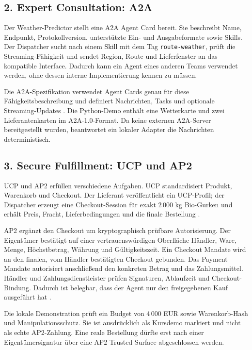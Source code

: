 \documentclass[11pt,a4paper]{article}
\begin{document}
\subsection{2. Expert Consultation: A2A}

Der Weather-Predictor stellt eine A2A Agent Card bereit. Sie beschreibt Name,
Endpunkt, Protokollversion, unterstützte Ein- und Ausgabeformate sowie Skills.
Der Dispatcher sucht nach einem Skill mit dem Tag
\texttt{route-weather}, prüft die Streaming-Fähigkeit und sendet Region,
Route und Lieferfenster an das kompatible Interface. Dadurch kann ein Agent
eines anderen Teams verwendet werden, ohne dessen interne Implementierung
kennen zu müssen.

Die A2A-Spezifikation verwendet Agent Cards genau für diese
Fähigkeitsbeschreibung und definiert Nachrichten, Tasks und optionale
Streaming-Updates \cite{a2a}. Die Python-Demo enthält eine Wetterkarte und
zwei Lieferantenkarten im A2A-1.0-Format. Da keine externen A2A-Server
bereitgestellt wurden, beantwortet ein lokaler Adapter die Nachrichten
deterministisch.

\subsection{3. Secure Fulfillment: UCP und AP2}

UCP und AP2 erfüllen verschiedene Aufgaben. UCP standardisiert Produkt,
Warenkorb und Checkout. Der Lieferant veröffentlicht ein UCP-Profil; der
Dispatcher erzeugt eine Checkout-Session für exakt 2\,000 kg Bio-Gurken und
erhält Preis, Fracht, Lieferbedingungen und die finale Bestellung
\cite{ucp}.

AP2 ergänzt den Checkout um kryptographisch prüfbare Autorisierung. Der
Eigentümer bestätigt auf einer vertrauenswürdigen Oberfläche Händler, Ware,
Menge, Höchstbetrag, Währung und Gültigkeitszeit. Ein Checkout Mandate wird an
den finalen, vom Händler bestätigten Checkout gebunden. Das Payment Mandate
autorisiert anschließend den konkreten Betrag und das Zahlungsmittel.
Händler und Zahlungsdienstleister prüfen Signaturen, Ablaufzeit und
Checkout-Bindung. Dadurch ist belegbar, dass der Agent nur den freigegebenen
Kauf ausgeführt hat \cite{ap2}.

Die lokale Demonstration prüft ein Budget von 4\,000 EUR sowie Warenkorb-Hash
und Manipulationsschutz. Sie ist ausdrücklich als Kursdemo markiert und nicht
als echte AP2-Zahlung. Eine reale Bestellung dürfte erst nach einer
Eigentümersignatur über eine AP2 Trusted Surface abgeschlossen werden.
\end{document}
